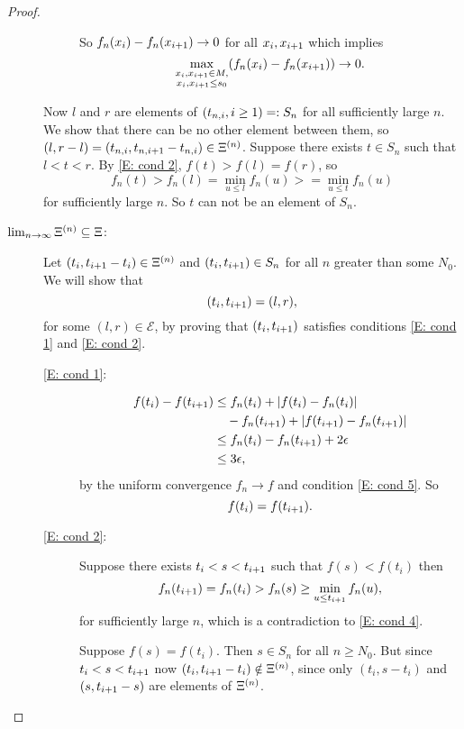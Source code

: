 \begin{proof}
\begin{description}
\begin{description}
So $f_n(x_i) - f_n(x_{i+1}) \rightarrow 0$ for all $x_i, x_{i+1}$ which implies 
\begin{equation*}
\max_{\substack{x_i, x_{i+1} \in M, \\ x_i, x_{i+1} \leq s_0}} (f_n(x_i) - f_n(x_{i+1})) \rightarrow 0.
\end{equation*}
\end{description} %
Now $l$ and $r$ are elements of $(t_{n, i}, i \geq 1) =: S_n$ for all sufficiently large $n$.
We show that there can be no other element between them, 
so $(l, r-l) = (t_{n, i}, t_{n, i+1} - t_{n, i}) \in \Xi^{(n)}$.
Suppose there exists $t \in S_n$ such that $l < t < r$.
By \eqref{E: cond 2}, $f(t) > f(l) = f(r)$, so
\begin{equation*}
f_n(t) > f_n(l) = \min_{u \leq l} f_n(u) >= \min_{u \leq t} f_n(u)
\end{equation*}
for sufficiently large $n$. So $t$ can not be an element of $S_n$.

\item[$\lim_{n \rightarrow \infty} \Xi^{(n)} \subseteq \Xi$:]
Let $(t_i, t_{i+1} - t_i) \in \Xi^{(n)}$ and $(t_i, t_{i+1}) \in S_n$
for all $n$ greater than some $N_0$.
We will show that
\begin{equation}
(t_i, t_{i+1} ) = (l,r),
\end{equation}
for some $(l,r) \in \mathcal{E}$,
by proving that $(t_i, t_{i+1})$ satisfies conditions \eqref{E: cond 1} and \eqref{E: cond 2}.


\begin{description} %
	\item[\eqref{E: cond 1}:]
\begin{equation}
\begin{aligned}
f(t_i) - f(t_{i+1}) 
&\leq f_n(t_i) + |f(t_i) - f_n(t_i)| \\
&\quad- f_n(t_{i+1}) + |f(t_{i+1}) - f_n(t_{i+1})| \\
&\leq f_n(t_i) - f_n(t_{i+1}) + 2\epsilon \\
&\leq 3\epsilon,
\end{aligned}
\end{equation}
by the uniform convergence $f_n \rightarrow f$ and condition \eqref{E: cond 5}.
So
\begin{equation}
f(t_i) = f(t_{i+1}).
\end{equation}

	\item[\eqref{E: cond 2}:]
Suppose there exists $t_i < s < t_{i+1}$ such that
$f(s) < f(t_i)$
then
\begin{equation*}
f_n(t_{i+1}) = f_n(t_i) > f_n(s) \geq \min_{u \leq t_{i+1}}f_n(u),
\end{equation*}
for sufficiently large $n$, which is a contradiction to \eqref{E: cond 4}.

Suppose $f(s) = f(t_i)$. Then $s \in S_n$ for all $n \geq N_0$.
But since $t_i < s < t_{i+1}$ now $(t_i, t_{i+1} - t_i) \notin \Xi^{(n)}$,
since only $(t_i, s - t_i)$ and $(s, t_{i+1} - s)$ are elements of $\Xi^{(n)}$.
\end{description} %
\end{description} %
\end{proof}
